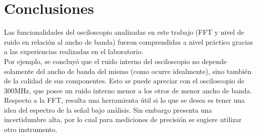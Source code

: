 \documentclass[a4paper,10pt]{article}
\begin{document}
	\newpage 
	\section{Conclusiones}
	Las funcionalidades del osciloscopio analizadas en este trabajo (FFT y nivel
	de ruido en relaci\'on al ancho de banda) fueron comprendidas a nivel 
	pr\'actico gracias a las experiencias realizadas en el laboratorio.\\
	\indent Por ejemplo, se concluy\'o que el ruido interno del osciloscopio no 
	depende solamente del ancho de banda del mismo (como ocurre idealmente), 
	sino también de la calidad de sus componentes. Esto se puede apreciar con el
	osciloscopio de 300MHz, que posee un ruido interno menor a los otros de 
	menor ancho de banda. \\
	\indent Respecto a la FFT, resulta una herramienta \'util si lo que se desea
	es tener una idea del espectro de la se\~nal bajo an\'alisis. Sin embargo 
	presenta una incertidumbre alta, por lo cual para mediciones de precisi\'on 
	se sugiere utilizar otro instrumento.
\end{document}
